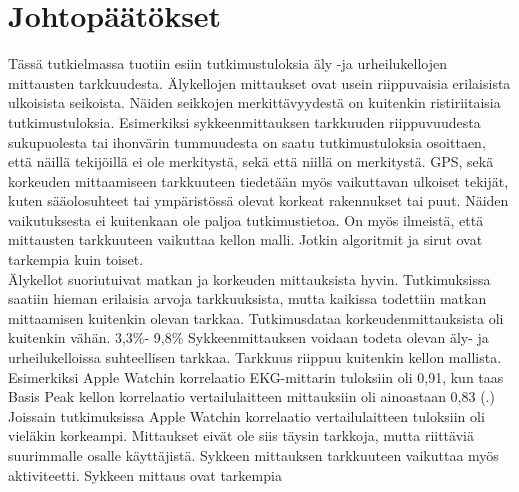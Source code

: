 \documentclass[utf8,bachelor,finnish]{bachelor}
\begin{document}
  
  
\chapter{Johtopäätökset}

Tässä tutkielmassa tuotiin esiin tutkimustuloksia äly -ja urheilukellojen mittausten tarkkuudesta.
 Älykellojen mittaukset ovat usein riippuvaisia erilaisista ulkoisista seikoista. Näiden seikkojen merkittävyydestä on kuitenkin ristiriitaisia tutkimustuloksia.
  Esimerkiksi sykkeenmittauksen tarkkuuden riippuvuudesta sukupuolesta tai ihonvärin tummuudesta on saatu tutkimustuloksia
   osoittaen, että näillä tekijöillä ei ole merkitystä, sekä että niillä on merkitystä. GPS, sekä korkeuden mittaamiseen tarkkuuteen tiedetään myös vaikuttavan
    ulkoiset tekijät, kuten sääolosuhteet tai ympäristössä olevat korkeat rakennukset tai puut. Näiden vaikutuksesta ei kuitenkaan ole paljoa tutkimustietoa.
     On myös ilmeistä, että mittausten tarkkuuteen vaikuttaa kellon malli. Jotkin algoritmit ja sirut ovat tarkempia kuin toiset.\\

Älykellot suoriutuivat matkan ja korkeuden mittauksista hyvin. Tutkimuksissa saatiin hieman erilaisia arvoja tarkkuuksista, mutta kaikissa
 todettiin matkan mittaamisen kuitenkin olevan tarkkaa. Tutkimusdataa korkeudenmittauksista oli kuitenkin vähän. 3,3\%- 9,8\%
  Sykkeenmittauksen voidaan todeta olevan äly- ja urheilukelloissa suhteellisen tarkkaa. Tarkkuus riippuu kuitenkin kellon mallista.
   Esimerkiksi Apple Watchin korrelaatio EKG-mittarin tuloksiin oli 0,91, kun taas Basis Peak kellon korrelaatio vertailulaitteen mittauksiin
    oli ainoastaan 0,83 (\cite{wang_accuracy_2017}.) Joissain tutkimuksissa Apple Watchin korrelaatio vertailulaitteen tuloksiin oli vieläkin korkeampi.
     Mittaukset eivät ole siis täysin tarkkoja, mutta riittäviä suurimmalle osalle käyttäjistä. Sykkeen mittauksen tarkkuuteen vaikuttaa myös
      aktiviteetti. Sykkeen mittaus ovat tarkempia \\
\end{document}
